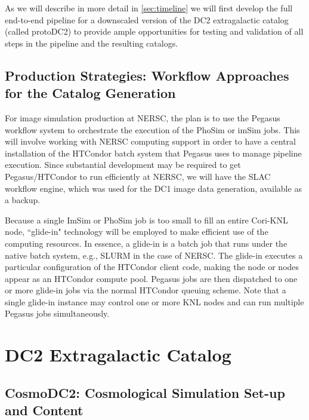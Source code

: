 \documentclass[preprint,times]{aastex61}
\begin{document}
As we will describe in more detail in \autoref{sec:timeline} we will first develop the full end-to-end pipeline for a downscaled version of the DC2 extragalactic catalog (called protoDC2) to provide ample opportunities for testing and validation of all steps in the pipeline and the resulting catalogs.

\subsection{Production Strategies: Workflow Approaches for the Catalog Generation}
\label{sec:worklfow}
For image simulation production at NERSC, the plan is to use the Pegasus workflow system to orchestrate the execution of the PhoSim or imSim jobs.  This will involve working with NERSC computing support in order to have a central installation of the HTCondor batch system that Pegasus uses to manage pipeline execution.  Since substantial development may be required to get Pegasus/HTCondor to run efficiently at NERSC, we will have the SLAC workflow engine, which was used for the DC1 image data generation, available as a backup. 

Because a single ImSim or PhoSim job is too small to fill an entire Cori-KNL node, ``glide-in" technology will be employed to make efficient use of the computing resources.  In essence, a glide-in is a batch job that runs under the native batch system, e.g., SLURM in the case of NERSC.  The glide-in executes a particular configuration of the HTCondor client code, making the node or nodes appear as an HTCondor compute pool.  Pegasus jobs are then dispatched to one or more glide-in jobs via the normal HTCondor queuing scheme.  Note that a single glide-in instance may control one or more KNL nodes and can run multiple Pegasus jobs simultaneously.

\section{DC2 Extragalactic Catalog}

\subsection{CosmoDC2: Cosmological Simulation Set-up and Content}
\label{cosmoDC2}
\end{document}

